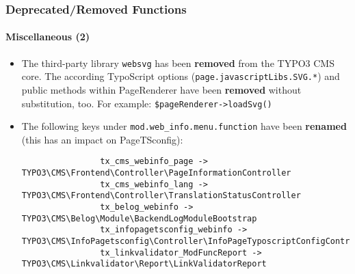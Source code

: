 
\begin{frame}[fragile]
	\frametitle{Deprecated/Removed Functions}
	\framesubtitle{Miscellaneous (2)}

	\lstset{basicstyle=\tiny\ttfamily}

	\begin{itemize}

		\item The third-party library \texttt{websvg} has been \textbf{removed}
			from the TYPO3 CMS core. The according TypoScript options
			(\texttt{page.javascriptLibs.SVG.*}) and public methods within
			PageRenderer have been \textbf{removed} without substitution, too.\newline
			For example: \texttt{\$pageRenderer->loadSvg()}

		\item The following keys under \texttt{mod.web\_info.menu.function}
			have been \textbf{renamed} (this has an impact on PageTSconfig):

			\begin{lstlisting}
				tx_cms_webinfo_page -> TYPO3\CMS\Frontend\Controller\PageInformationController
				tx_cms_webinfo_lang -> TYPO3\CMS\Frontend\Controller\TranslationStatusController
				tx_belog_webinfo -> TYPO3\CMS\Belog\Module\BackendLogModuleBootstrap
				tx_infopagetsconfig_webinfo -> TYPO3\CMS\InfoPagetsconfig\Controller\InfoPageTyposcriptConfigController
				tx_linkvalidator_ModFuncReport -> TYPO3\CMS\Linkvalidator\Report\LinkValidatorReport
			\end{lstlisting}

	\end{itemize}

\end{frame}


